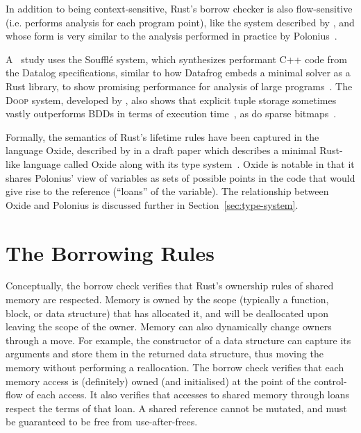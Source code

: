 \documentclass[11pt,a4paper,twoside,openany]{report}
\begin{document}
In addition to being context-sensitive, Rust's borrow checker is also
flow-sensitive (i.e. performs analysis for each program point), like the system
described by \citeauthor*{Hardekopf:2009:SFP:1480881.1480911}, and whose form is
very similar to the analysis performed in practice by
Polonius~\cite{Hardekopf:2009:SFP:1480881.1480911}.

A \citeyear{scholz_fast_2016}~study uses the Souffl{\'e} system, which
synthesizes performant C++ code from the Datalog specifications, similar to how
Datafrog embeds a minimal solver as a Rust library, to show promising
performance for analysis of large programs~\cite{scholz_fast_2016}. The
\textsc{Doop} system, developed by \citeauthor*{smaragdakis_using_2010}, also
shows that explicit tuple storage sometimes vastly outperforms BDDs in terms of
execution time~\cite{smaragdakis_using_2010}, as do sparse
bitmaps~\cite{Hardekopf:2007:AGF:1250734.1250767}.

Formally, the semantics of Rust's lifetime rules have been captured in the
language Oxide, described by \citeauthor*{weiss_oxide:_2019} in a draft paper
which describes a minimal Rust-like language called Oxide along with its type
system~\cite{weiss_oxide:_2019}. Oxide is notable in that it shares Polonius'
view of variables as sets of possible points in the code that would give rise to
the reference (``loans'' of the variable). The relationship between Oxide and
Polonius is discussed further in Section~\ref{sec:type-system}.

\section{The Borrowing Rules}\label{sec:borrowing-rules}

Conceptually, the borrow check verifies that Rust's ownership rules of shared
memory are respected. Memory is owned by the scope (typically a function, block,
or data structure) that has allocated it, and will be deallocated upon leaving
the scope of the owner. Memory can also dynamically change owners through a
move. For example, the constructor of a data structure can capture its arguments
and store them in the returned data structure, thus moving the memory without
performing a reallocation. The borrow check verifies that each memory access is
(definitely) owned (and initialised) at the point of the control-flow of each
access. It also verifies that accesses to shared memory through loans respect
the terms of that loan. A shared reference cannot be mutated, and must be
guaranteed to be free from use-after-frees.
\end{document}
